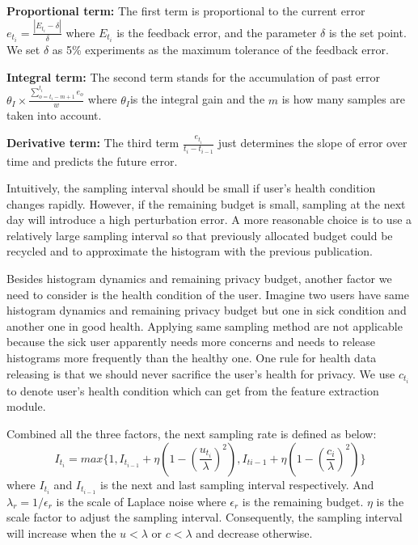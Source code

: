 \documentclass[10pt,conference]{IEEEtran}
\begin{document}
\textbf{Proportional term:} The first term is proportional to the current error $e_{t_i}=\frac{|E_{t_i}-\delta|}{\delta}$
where $E_{t_i}$ is the feedback error, and the parameter $\delta$ is the set point. We set $\delta$ as 5\% experiments as the maximum tolerance of the feedback error.

\textbf{Integral term:} The second term stands for the accumulation of past error $\theta_I\times \frac{\sum_{o=t_i-m+1}^{t_i}e_{o}}{w}$ where $\theta_I$is the integral gain and the $m$ is how many samples are taken into account. 

\textbf{Derivative term:} The third term $\frac{e_{t_i}}{t_i-t_{i-1}}$ just determines the slope of error over time and predicts the future error.

Intuitively, the sampling interval should be small if user's health condition changes rapidly. However, if the remaining budget is small, sampling at the next day will introduce a high perturbation error. A more reasonable choice is to use a relatively large sampling interval so that previously allocated budget could be recycled and to approximate the histogram with the previous publication.

Besides histogram dynamics and remaining privacy budget, another factor we need to consider is the health condition of the user. Imagine two users have same histogram dynamics and remaining privacy budget but one in sick condition and another one in good health. Applying same sampling method are not applicable because the sick user apparently needs more concerns and needs to release histograms more frequently than the healthy one. One rule for health data releasing is that we should never sacrifice the user's health for privacy. We use $c_{t_i}$ to denote user's health condition which can get from the feature extraction module.

Combined all the three factors, the next sampling rate is defined as below:
\begin{equation}\label{interval}
I_{t_i}=max\{1,I_{t_{i-1}}+\eta(1-(\frac{u_{t_i}}{\lambda})^2),I_{t{i-1}}+\eta(1-(\frac{c_i}{\lambda})^2)\}
\end{equation}
where $I_{t_i}$ and $I_{t_{i-1}}$ is the next and last sampling interval respectively. And $\lambda_r=1/\epsilon_r$ is the scale of Laplace noise where $\epsilon_r$ is the remaining budget. $\eta$ is the scale factor to adjust the sampling interval. Consequently, the sampling interval will increase when the $u<\lambda$ or $c<\lambda$ and decrease otherwise.
\end{document}

